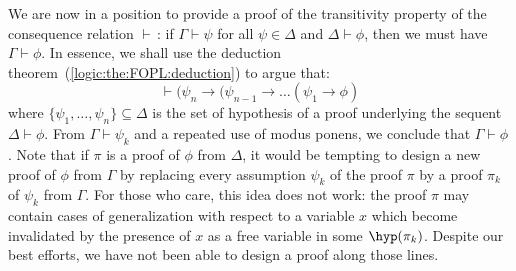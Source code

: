 We are now in a position to provide a proof of the transitivity
property of the consequence relation $\vdash$\,: if
$\Gamma\vdash\psi$ for all $\psi\in\Delta$ and $\Delta\vdash\phi$,
then we must have $\Gamma\vdash\phi$. In essence, we shall use the
deduction theorem~(\ref{logic:the:FOPL:deduction}) to argue that:
    \[
    \vdash(\psi_{n}\to(\psi_{n-1}\to\ldots(\psi_{1}\to\phi)
    \]
where $\{\psi_{1},\ldots,\psi_{n}\}\subseteq\Delta$ is the set of
hypothesis of a proof underlying the sequent $\Delta\vdash\phi$.
From $\Gamma\vdash\psi_{k}$ and a repeated use of modus ponens, we
conclude that $\Gamma\vdash\phi$. Note that if $\pi$ is a proof of
$\phi$ from $\Delta$, it would be tempting to design a new proof of
$\phi$ from $\Gamma$ by replacing every assumption $\psi_{k}$ of the
proof $\pi$ by a proof $\pi_{k}$ of $\psi_{k}$ from $\Gamma$. For
those who care, this idea does not work: the proof $\pi$ may contain
cases of generalization with respect to a variable $x$ which become
invalidated by the presence of $x$ as a free variable in some
$\hyp(\pi_{k})$. Despite our best efforts, we have not been able to
design a proof along those lines.

